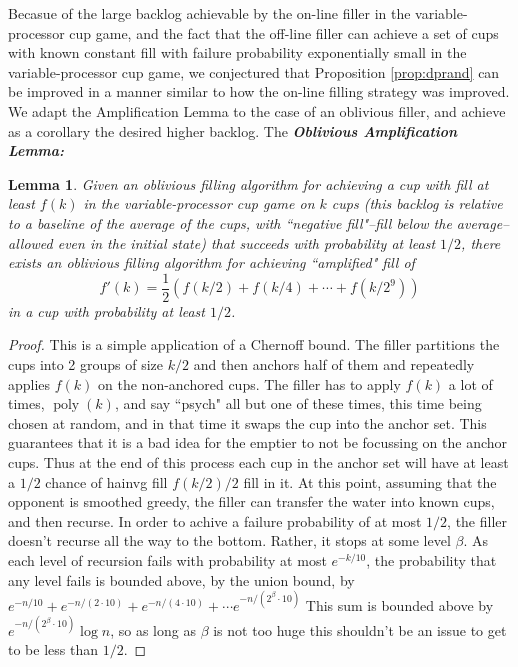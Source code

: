\documentclass[twocolumn]{article}[11pt]
\newcommand{\defn}[1]{{\textit{\textbf{\boldmath #1}}}}
\DeclareMathOperator{\poly}{\text{poly}}
\newtheorem{lemma}{Lemma}
\begin{document}
Becasue of the large backlog achievable by the on-line filler in the
variable-processor cup game, and the fact that the off-line filler can 
achieve a set of cups with known constant fill with failure probability
exponentially small in the variable-processor cup game, we conjectured that 
Proposition \ref{prop:dprand} can be improved in a manner similar to how the
on-line filling strategy was improved. We adapt the Amplification Lemma to the
case of an oblivious filler, and achieve as a corollary the desired higher backlog.
The \defn{Oblivious Amplification Lemma:}
\begin{lemma}
  \label{lem:obliviousamplification}
  Given an oblivious filling algorithm for achieving a cup with fill at least
  $f(k)$ in the variable-processor cup game on $k$ cups (this backlog is
  relative to a baseline of the average of the cups, with ``negative
  fill"--fill below the average--allowed even in the initial state) that
  succeeds with probability at least $1/2$, there exists an oblivious filling
  algorithm for achieving ``amplified" fill of $$f'(k) = \frac{1}{2}(f(k/2) +
  f(k/4) + \cdots + f(k/2^9))$$ in a cup with probability at least $1/2$.
\end{lemma}
\begin{proof}
  This is a simple application of a Chernoff bound.
  The filler partitions the cups into 2 groups of size $k/2$ and then anchors
  half of them and repeatedly applies $f(k)$ on the non-anchored cups.  The
  filler has to apply $f(k)$ a lot of times, $\poly(k)$, and say ``psych" all
  but one of these times, this time being chosen at random, and in that time it
  swaps the cup into the anchor set. This guarantees that it is a bad idea for
  the emptier to not be focussing on the anchor cups. Thus at the end of this process each
  cup in the anchor set will have at least a $1/2$ chance of hainvg fill $f(k/2)/2$ fill in it.
  At this point, assuming that the opponent is smoothed greedy, the filler can
  transfer the water into known cups, and then recurse. In order to achive a
  failure probability of at most $1/2$, the filler doesn't recurse all the way
  to the bottom. Rather, it stops at some level $\beta$. As each level of recursion fails with probability at
  most $e^{-k/10}$, the probability that any level fails is bounded above, by
  the union bound, by $e^{-n/10} + e^{-n/(2\cdot 10)} + e^{-n/(4\cdot 10)} + \cdots e^{-n/(2^\beta \cdot 10)}$
  This sum is bounded above by $e^{-n/(2^\beta \cdot 10)} \log n $, so as long
  as $\beta$ is not too huge this shouldn't be an issue to get to be less than $1/2$.
\end{proof}
\end{document}
